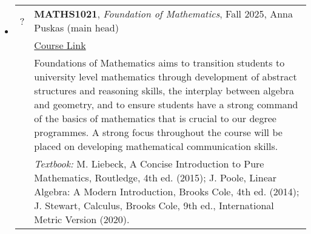 \documentclass[12pt]{article}
\begin{document}
\begin{itemize}[leftmargin = *]
     \item[]
        \begin{tabularx}{\textwidth}{@{}lX@{}}
            ? & \textbf{MATHS1021}, \textit{Foundation of Mathematics}, Fall 2025, Anna Puskas (main head)
            \\
            &
            \href{https://www.gla.ac.uk/coursecatalogue/course/?code=MATHS1021}{Course Link} \\
            &
            Foundations of Mathematics aims to transition students to university level mathematics through development of abstract structures and reasoning skills, the interplay between algebra and geometry, and to ensure students have a strong command of the basics of mathematics that is crucial to our degree programmes. A strong focus throughout the course will be placed on developing mathematical communication skills.         \\
            & \textit{Textbook:} 
            M. Liebeck, A Concise Introduction to Pure Mathematics, Routledge, 4th ed. (2015);
            J. Poole, Linear Algebra: A Modern Introduction, Brooks Cole, 4th ed. (2014); 
            J. Stewart, Calculus, Brooks Cole, 9th ed., International Metric Version (2020).

        \end{tabularx}


\end{itemize}
\end{document}

